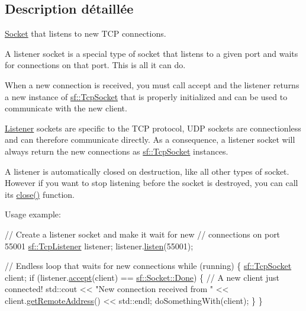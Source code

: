 \subsection{Description détaillée}
\hyperlink{classsf_1_1Socket}{Socket} that listens to new T\+CP connections. 

A listener socket is a special type of socket that listens to a given port and waits for connections on that port. This is all it can do.

When a new connection is received, you must call accept and the listener returns a new instance of \hyperlink{classsf_1_1TcpSocket}{sf\+::\+Tcp\+Socket} that is properly initialized and can be used to communicate with the new client.

\hyperlink{classsf_1_1Listener}{Listener} sockets are specific to the T\+CP protocol, U\+DP sockets are connectionless and can therefore communicate directly. As a consequence, a listener socket will always return the new connections as \hyperlink{classsf_1_1TcpSocket}{sf\+::\+Tcp\+Socket} instances.

A listener is automatically closed on destruction, like all other types of socket. However if you want to stop listening before the socket is destroyed, you can call its \hyperlink{classsf_1_1TcpListener_a3a00a850506bd0f9f48867a0fe59556b}{close()} function.

Usage example\+: 
\begin{DoxyCode}
\textcolor{comment}{// Create a listener socket and make it wait for new}
\textcolor{comment}{// connections on port 55001}
\hyperlink{classsf_1_1TcpListener}{sf::TcpListener} listener;
listener.\hyperlink{classsf_1_1TcpListener_a409d9350d3abfea9636df8cf4a61004e}{listen}(55001);

\textcolor{comment}{// Endless loop that waits for new connections}
\textcolor{keywordflow}{while} (running)
\{
    \hyperlink{classsf_1_1TcpSocket}{sf::TcpSocket} client;
    \textcolor{keywordflow}{if} (listener.\hyperlink{classsf_1_1TcpListener_ae2c83ce5a64d50b68180c46bef0a7346}{accept}(client) == \hyperlink{classsf_1_1Socket_a51bf0fd51057b98a10fbb866246176dca1de3a85bc56d3ae85b3d0f3cfd04ae90}{sf::Socket::Done})
    \{
        \textcolor{comment}{// A new client just connected!}
        std::cout << \textcolor{stringliteral}{"New connection received from "} << client.\hyperlink{classsf_1_1TcpSocket_aa8579c203b1fd21beb74d7f76444a94c}{getRemoteAddress}() << 
      std::endl;
        doSomethingWith(client);
    \}
\}
\end{DoxyCode}


